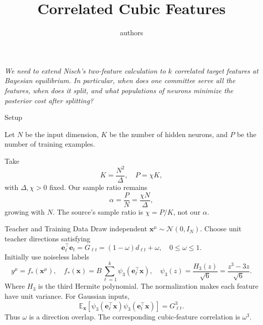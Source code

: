 \documentclass[11pt, reqno]{amsart}
\title{Correlated Cubic Features}
\author{authors}
\date{}
\makeatletter
\def\section{\@startsection{section}{1}%
  \z@{.7\linespacing\@plus\linespacing}{.5\linespacing}%
  {\normalfont\scshape\centering}}
\theoremstyle{notestyle}
\theoremstyle{defstyle}
\makeatother
\begin{document}
\maketitle
\thispagestyle{empty}

\noindent\textit{%
We need to extend Nisch's two-feature calculation to $k$ correlated target features at Bayesian equilibrium. In particular, when does one committee serve all the features, when does it split, and what populations of neurons minimize the posterior cost after splitting?}



\section{Setup}

Let $N$ be the input dimension, $K$ be the number of hidden neurons, and $P$ be the number of training examples.

Take
\begin{equation}
    K = \frac{N^2}{\Delta},\quad P = \chi K,
\end{equation}
with $\Delta, \chi > 0$ fixed. Our sample ratio remains
\begin{equation}
    \alpha = \frac PN = \frac{\chi N}{\Delta},
\end{equation}
growing with $N$. The source's sample ratio is $\chi = P/K$, not our $\alpha$.

\section{Teacher and Training Data}
Draw independent $\mathbf x^\mu \sim \mathcal N(0, I_N)$. Choose unit teacher directions satisfying
\begin{equation}
    \mathbf e_\ell^\top \mathbf e_t = G_{\ell t} = (1 - \omega)d_{\ell t} + \omega,\quad 0 \leq \omega \leq 1.
\end{equation}
Initially use noiseless labels
\begin{equation}
    y^\mu = f_*(\mathbf x^\mu),\quad f_*(\mathbf x) = B\sum_{\ell = 1}^k \psi_3(\mathbf e_\ell^\top \mathbf x),\quad \psi_3(z) = \frac{H_3(z)}{\sqrt 6} = \frac{z^3 - 3z}{\sqrt{6}}.
\end{equation}
Where $H_3$ is the third Hermite polynomial. The normalization makes each feature have unit variance. For Gaussian inputs,
\begin{equation}
    \mathbb E_{\mathbf x} [\psi_3(\mathbf e_\ell^\top \mathbf x)\psi_3(\mathbf e_t^\top\mathbf x)] = G_{\ell t}^3.
\end{equation}
Thus $\omega$ is a direction overlap. The corresponding cubic-feature correlation is $\omega^3$.
\end{document}
